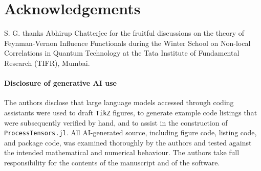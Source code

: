 \documentclass[submission, PhysCodeb]{SciPost}
\begin{document}














\section*{Acknowledgements}
S. G. thanks Abhirup Chatterjee for the fruitful discussions on the theory of Feynman-Vernon Influence Functionals during the  Winter School on Non-local Correlations in Quantum Technology at the Tata Institute of Fundamental Research (TIFR), Mumbai. 

\paragraph{Disclosure of generative AI use}
The authors disclose that large language models accessed through coding assistants were used to draft \texttt{TikZ} figures, to generate example code listings that were subsequently verified by hand, and to assist in the construction of \texttt{ProcessTensors.jl}.
All AI-generated source, including figure code, listing code, and package code, was examined thoroughly by the authors and tested against the intended mathematical and numerical behaviour.
The authors take full responsibility for the contents of the manuscript and of the software.
\end{document}
